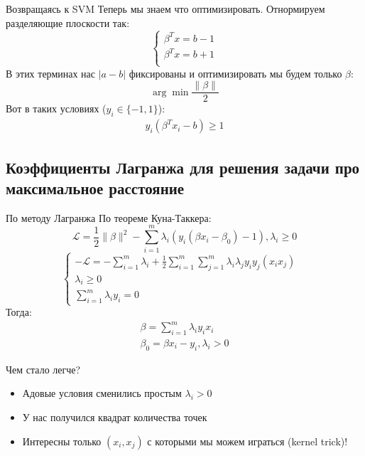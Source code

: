 \documentclass[14pt, fleqn, xcolor={dvipsnames, table}]{beamer}
\begin{document}
\begin{frame}{Возвращаясь к SVM}
\small
Теперь мы знаем что оптимизировать. Отнормируем разделяющие плоскости так:
$$
\left\{\begin{array}{l}
\beta^T x = b - 1 \\
\beta^T x = b + 1 \\
\end{array}\right.
$$
В этих терминах нас $|a - b|$ фиксированы и оптимизировать мы будем только $\beta$:
$$
\arg \min \frac{\|\beta\|}{2}
$$
Вот в таких условиях ($y_i \in \{-1,1\}$):
$$%
\begin{array}{l}
y_i(\beta^T x_i - b) \ge 1
\end{array}
$$
\end{frame}

\subsection{Коэффициенты Лагранжа для решения задачи про максимальное расстояние}
\begin{frame}{По методу Лагранжа}
По теореме Куна-Таккера: \
$$
\mathcal{L} = \frac{1}{2}\|\beta\|^2 - \sum_{i=1}^m\lambda_i(y_i(\beta x_i - \beta_0) - 1), \lambda_i \ge 0
$$ 
$$
\left\{  
  \begin{array}{ll}  
  -\mathcal{L} = -\sum_{i=1}^m\lambda_i + \frac{1}{2}\sum_{i=1}^m\sum_{j=1}^m\lambda_i\lambda_j y_i y_j (x_i x_j) \\  
  \lambda_i \ge 0 & \\
  \sum_{i=1}^m\lambda_i y_i = 0
  \end{array}   
  \right.
$$
Тогда: \
$$\begin{array}{l}
\beta = \sum_{i=1}^m\lambda_i y_i x_i \\
\beta_0 = \beta x_i - y_i, \lambda_i > 0
\end{array}$$
\end{frame}

\begin{frame}{Чем стало легче?}
\begin{itemize}
  \item Адовые условия сменились простым $\lambda_i > 0$
  \item У нас получился квадрат количества точек
  \item Интересны только $(x_i, x_j)$ с которыми мы можем играться (kernel trick)!
\end{itemize}
\end{frame}
\end{document}
